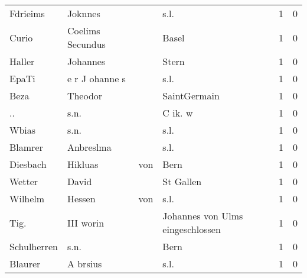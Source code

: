 \documentclass[10pt,a4paper,landscape]{article}
\begin{document}
\begin{longtable}{llllrr}
                 Fdrieims &                            Joknnes &             &                                        s.l. &          1 &         0 \\
                    Curio &                   Coelims Secundus &             &                                       Basel &          1 &         0 \\
                   Haller &                           Johannes &             &                                       Stern &          1 &         0 \\
                    EpaTi &                     e r J ohanne s &             &                                        s.l. &          1 &         0 \\
                     Beza &                            Theodor &             &                                SaintGermain &          1 &         0 \\
                       .. &                               s.n. &             &                                     C ik. w &          1 &         0 \\
                    Wbias &                               s.n. &             &                                        s.l. &          1 &         0 \\
                  Blamrer &                          Anbreslma &             &                                        s.l. &          1 &         0 \\
                 Diesbach &                            Hikluas &         von &                                        Bern &          1 &         0 \\
                   Wetter &                              David &             &                                   St Gallen &          1 &         0 \\
                  Wilhelm &                             Hessen &         von &                                        s.l. &          1 &         0 \\
                     Tig. &                          III worin &             &            Johannes von Ulms eingeschlossen &          1 &         0 \\
              Schulherren &                               s.n. &             &                                        Bern &          1 &         0 \\
                  Blaurer &                           A brsius &             &                                        s.l. &          1 &         0 \\

\end{longtable}
\end{document}
